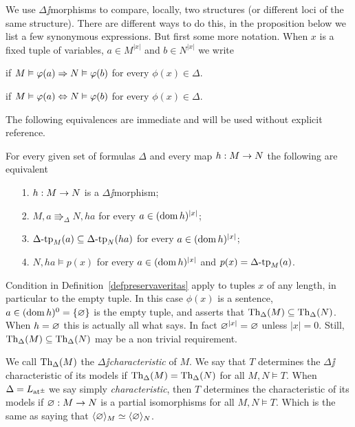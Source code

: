 \documentclass[creche.tex]{subfiles}
\begin{document}
We use $\Delta\jj$morphisms to compare, locally, two structures (or different loci of the same structure). There are different ways to do this, in the proposition below we list a few synonymous expressions. But first some more notation. When $x$ is a fixed tuple of variables, $a\in M^{|x|}$ and $b\in N^{|x|}$ we write

\hfill if $M\vDash\varphi(a)\Rightarrow N\vDash\varphi(b)$ for every $\phi(x)\in\Delta$. 

\hfill if $M\vDash\varphi(a)\Leftrightarrow N\vDash\varphi(b)$ for every $\phi(x)\in\Delta$. 

The following equivalences are immediate and will be used without explicit reference.

\begin{proposition}\label{oss_Delta-morfismi}
For every given set of formulas $\Delta$ and every map $h:M\rightarrow N$ the following are equivalent
\begin{itemize}
\item[1.] $h:M\rightarrow N$ is a $\Delta\jj$morphism;
\item[2.] $M,a\Rrightarrow_\Delta N,ha$  for every $a\in(\mathop{\rm dom} h)^{|x|}$;
\item[3.] $\Delta\mbox{-}\textrm{tp}_M(a)\subseteq\Delta\mbox{-}\textrm{tp}_N(ha)$ for every $a\in(\mathop{\rm dom} h)^{|x|}$;
\item[4.] $N,ha\models p(x)$ for every $a\in(\mathop{\rm dom} h)^{|x|}$ and $p(x)=\Delta\mbox{-}\textrm{tp}_M(a)$.\QED
\end{itemize}
\end{proposition}



\begin{remark}\label{rmk_characteristic}
Condition  in Definition~\ref{defpreservaveritas} apply to tuples $x$ of any length, in particular to the empty tuple. In this case $\phi(x)$ is a sentence, $a\in(\mathop{\rm dom} h)^0=\{\varnothing\}$ is the empty tuple, and  asserts that $\textrm{Th}_\Delta(M)\subseteq\textrm{Th}_\Delta(N)$. When $h=\varnothing$ this is actually all what  says. In fact $\varnothing^{|x|}=\varnothing$ unless $|x|=0$. Still,  $\textrm{Th}_\Delta(M)\subseteq\textrm{Th}_\Delta(N)$ may be a non trivial requirement.\QED
\end{remark}


\begin{definition}\label{def_characteristic}
We call $\textrm{Th}_\Delta(M)$ the \emph{$\Delta\jj$characteristic} of $M$. We say that $T$ determines the $\Delta\jj$characteristic of its models if $\textrm{Th}_\Delta(M)=\textrm{Th}_\Delta(N)$ for all $M,N\models T$. When $\Delta=L_{{\tiny\rm at^\pm}}\hskip-.3ex$ we say simply \emph{characteristic}, then $T$ determines the characteristic of its models if $\varnothing:M\to N$ is a partial isomorphisms for all $M,N\models T$. Which is the same as saying that $\langle\varnothing\rangle_M\simeq\langle\varnothing\rangle_N$.\QED
\end{definition}
\end{document}
